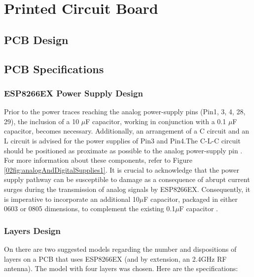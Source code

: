 \newpage

\section{Printed Circuit Board}\label{03Sec:PCB}



    


\subsection{PCB Design}\label{03Sub:PCBDesign}


\subsection{PCB Specifications}\label{03Sub:PCBSpecifications}



\subsubsection{ESP8266EX Power Supply Design}\label{02SubSub:PowerSupplyDesign}


Prior to the power traces reaching the analog power-supply pins (Pin1, 3, 4, 28, 29), the inclusion of a 10 $\mu$F capacitor, working 
in conjunction with a 0.1 $\mu$F capacitor, becomes necessary. Additionally, an arrangement of a C circuit and an L circuit is advised 
for the power supplies of Pin3 and Pin4.The C-L-C circuit should be positioned as proximate as possible to the analog power-supply pin \cite{ESP8266HGL}. 
For more information about these components, refer to Figure \ref{02fig:analogAndDigitalSupplies1}.
It is crucial to acknowledge that the power supply pathway can be susceptible to damage as a consequence of abrupt current surges 
during the transmission of analog signals by ESP8266EX. Consequently, it is imperative to incorporate an additional 10$\mu$F capacitor, 
packaged in either 0603 or 0805 dimensions, to complement the existing 0.1$\mu$F capacitor \cite{ESP8266HGL}.

\subsubsection{Layers Design}\label{02SubSub:LayersDesign}

On \cite{ESP8266HGL} there are two suggested models regarding the number and dispositions of layers on a PCB
that uses ESP8266EX (and by extension, an 2.4GHz RF antenna). The model with four layers was chosen. Here are 
the specifications: 


